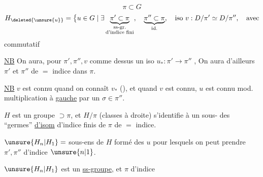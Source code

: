 
\[ \pi\subset G \]
\[
H_{\deleted{\unsure{u}}}=\bigl\{u\in G\mid \exists
\underbrace{\pi'\subset\pi}_{\substack{\text{ss-gr.}\\\text{d'indice fini}}},\quad
\underbrace{\pi''\subset\pi}_{\text{id.}},
\quad\text{iso }v:D/\pi'\simeq D/\pi'',\quad\text{avec}
\]
commutatif

\uline{NB} On aura, pour $\pi',\pi'',v$ comme dessus un iso
$u_*:\pi'\longrightarrow\pi''$ ,
On aura d'ailleurs $\pi'$ et $\pi''$ de $=$ indice dans $\pi$.

\uline{NB} $v$ est connu quand on connaît $v_*$ (\uline{}), et quand $v$ est connu, $u$ est connu  mod. multiplication à \uline{gauche} par un $\sigma\in\pi''$.


$H$ est un groupe $\supset\pi$, et $H/\pi$ (classes à droite) s'identifie à un sous- des ``germes'' \uline{d'isom}   d'indice finis de $\pi$ de $=$ indice.

$\unsure{H_n|H_1}=$ sous-ens de $H$ formé des $u$ pour lesquels on peut prendre $\pi',\pi''$ d'indice $\unsure{n|1}$.

$\unsure{H_n|H_1}$ est un \uline{ss-groupe}, et $\pi$ d'indice

